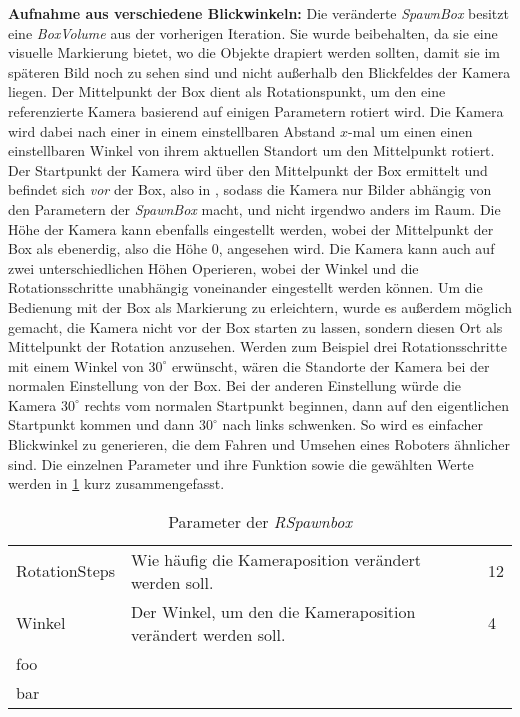 \textbf{Aufnahme aus verschiedene Blickwinkeln:} Die veränderte \textit{SpawnBox} besitzt eine \textit{BoxVolume} aus der vorherigen Iteration. Sie wurde beibehalten, da sie eine visuelle Markierung bietet, wo die Objekte drapiert werden sollten, damit sie im späteren Bild noch zu sehen sind und nicht außerhalb den Blickfeldes der Kamera liegen. Der Mittelpunkt der Box dient als Rotationspunkt, um den eine referenzierte Kamera basierend auf einigen Parametern rotiert wird. Die Kamera wird dabei nach einer  in einem einstellbaren Abstand $x$-mal um einen einen einstellbaren Winkel von ihrem aktuellen Standort um den Mittelpunkt rotiert. Der Startpunkt der Kamera wird über den Mittelpunkt der Box ermittelt und befindet sich \textit{vor} der Box, also in , sodass die Kamera nur Bilder abhängig von den Parametern der \textit{SpawnBox} macht, und nicht irgendwo anders im Raum. Die Höhe der Kamera kann ebenfalls eingestellt werden, wobei der Mittelpunkt der Box als ebenerdig, also die Höhe 0, angesehen wird. Die Kamera kann auch auf zwei unterschiedlichen Höhen Operieren, wobei der Winkel und die Rotationsschritte unabhängig voneinander eingestellt werden können. Um die Bedienung mit der Box als Markierung zu erleichtern, wurde es außerdem möglich gemacht, die Kamera nicht vor der Box starten zu lassen, sondern diesen Ort als Mittelpunkt der Rotation anzusehen. Werden zum Beispiel drei Rotationsschritte mit einem Winkel von $30^\circ$ erwünscht, wären die Standorte der Kamera bei der normalen Einstellung  von der Box. Bei der anderen Einstellung würde die Kamera $30^\circ$ rechts vom normalen Startpunkt beginnen, dann auf den eigentlichen Startpunkt kommen und dann $30^\circ$ nach links schwenken. So wird es einfacher Blickwinkel zu generieren, die dem Fahren und Umsehen eines Roboters ähnlicher sind. \newline
{}Die einzelnen Parameter und ihre Funktion sowie die gewählten Werte werden in \ref{tab:spawnboxParams} kurz zusammengefasst.
\begin{table}
\label{tab:spawnboxParams}
\begin{tabular}{lll}
RotationSteps & Wie häufig die Kameraposition verändert werden soll. & 12 \\
Winkel & Der Winkel, um den die Kameraposition verändert werden soll. & 4 \\
foo &  & \\
bar &  & \\
\end{tabular}
\caption{Parameter der \textit{RSpawnbox}}
\end{table}

